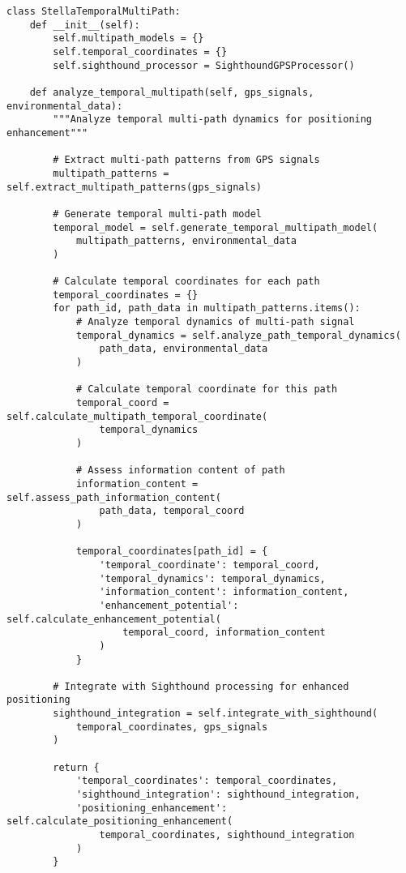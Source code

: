 \documentclass[12pt,a4paper]{article}
\begin{document}
\begin{lstlisting}[style=pythonstyle, caption=Temporal Multi-Path Analysis for GPS Enhancement]
class StellaTemporalMultiPath:
    def __init__(self):
        self.multipath_models = {}
        self.temporal_coordinates = {}
        self.sighthound_processor = SighthoundGPSProcessor()
    
    def analyze_temporal_multipath(self, gps_signals, environmental_data):
        """Analyze temporal multi-path dynamics for positioning enhancement"""
        
        # Extract multi-path patterns from GPS signals
        multipath_patterns = self.extract_multipath_patterns(gps_signals)
        
        # Generate temporal multi-path model
        temporal_model = self.generate_temporal_multipath_model(
            multipath_patterns, environmental_data
        )
        
        # Calculate temporal coordinates for each path
        temporal_coordinates = {}
        for path_id, path_data in multipath_patterns.items():
            # Analyze temporal dynamics of multi-path signal
            temporal_dynamics = self.analyze_path_temporal_dynamics(
                path_data, environmental_data
            )
            
            # Calculate temporal coordinate for this path
            temporal_coord = self.calculate_multipath_temporal_coordinate(
                temporal_dynamics
            )
            
            # Assess information content of path
            information_content = self.assess_path_information_content(
                path_data, temporal_coord
            )
            
            temporal_coordinates[path_id] = {
                'temporal_coordinate': temporal_coord,
                'temporal_dynamics': temporal_dynamics,
                'information_content': information_content,
                'enhancement_potential': self.calculate_enhancement_potential(
                    temporal_coord, information_content
                )
            }
        
        # Integrate with Sighthound processing for enhanced positioning
        sighthound_integration = self.integrate_with_sighthound(
            temporal_coordinates, gps_signals
        )
        
        return {
            'temporal_coordinates': temporal_coordinates,
            'sighthound_integration': sighthound_integration,
            'positioning_enhancement': self.calculate_positioning_enhancement(
                temporal_coordinates, sighthound_integration
            )
        }
    

\end{lstlisting}
\end{document}

